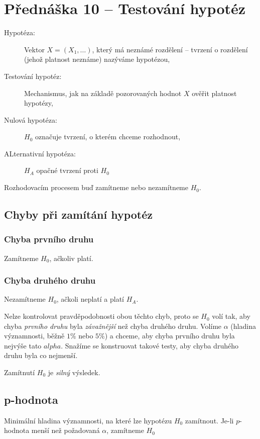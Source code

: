 \section{Přednáška 10 -- Testování hypotéz}

\begin{description}
    \item[Hypotéza:] Vektor $X=(X_1, \dots)$, který má neznámé rozdělení -- tvrzení o rozdělení (jehož platnost neznáme) nazýváme hypotézou,
    \item[Testování hypotéz:] Mechanismus, jak na základě pozorovaných hodnot $X$ ověřit platnost hypotézy,
    \item[Nulová hypotéza:] $H_0$ označuje tvrzení, o kterém chceme rozhodnout,
    \item[ALternativní hypotéza:] $H_A$ opačné tvrzení proti $H_0$
\end{description}

Rozhodovacím procesem buď zamítneme nebo nezamítneme $H_0$.

\subsection{Chyby při zamítání hypotéz}

\subsubsection*{Chyba prvního druhu}

Zamítneme $H_0$, ačkoliv platí.

\subsubsection*{Chyba druhého druhu}

Nezamítneme $H_0$, ačkoli neplatí a platí $H_A$.

Nelze kontrolovat pravděpodobnosti obou těchto chyb, proto se $H_0$ volí tak, aby chyba \textit{prvního druhu} byla \textit{závažnější} než chyba druhého druhu.
Volíme $\alpha$ (hladina významnosti, běžně $1\%$ nebo $5\%$) a chceme, aby chyba prvního druhu byla nejvýše tato $alpha$.
Snažíme se konstruovat takové testy, aby chyba druhého druhu byla co nejmenší.

Zamítnutí $H_0$ je \textit{silný} výsledek.

\subsection{p-hodnota}

Minimální hladina významnosti, na které lze hypotézu $H_0$ zamítnout.
Je-li $p$-hodnota menší než požadovaná $\alpha$, zamítneme $H_0$
